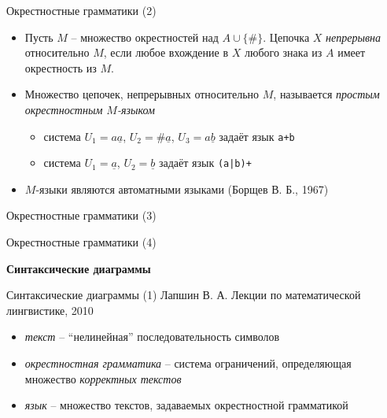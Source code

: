 \documentclass{beamer}
\begin{document}
\begin{frame}{Окрестностные грамматики (2)}
\begin{small}
\begin{itemize}
	\item Пусть $M$ -- множество окрестностей над $A \cup \{ \# \}$. Цепочка $X$ \textit{непрерывна} относительно $M$, если любое вхождение в $X$ любого знака из $A$ имеет окрестность из $M$.
	\item Множество цепочек, непрерывных относительно $M$, называется \textit{простым окрестностным $M$-языком}
		\begin{itemize}
			\item система $U_1 = a\underline{a}$, $U_2 = \#\underline{a}$, $U_3 = a\underline{b}$ задаёт язык \texttt{a+b}
			\item система $U_1 = \underline{a}$, $U_2 = \underline{b}$ задаёт язык \texttt{(a|b)+}
		\end{itemize}
	\item $M$-языки являются автоматными языками (Борщев В. Б., 1967)
\end{itemize}
\end{small}
\end{frame}

\begin{frame}{Окрестностные грамматики (3)}
\end{frame}

\begin{frame}{Окрестностные грамматики (4)}
\end{frame}



\begin{frame}{}
\begin{center}
	\textbf{Синтаксические диаграммы}
\end{center}
\end{frame}

\begin{frame}{Синтаксические диаграммы (1)}
Лапшин В. А. Лекции по математической лингвистике, 2010\\
\medskip
\begin{small}
\begin{itemize}
	\item \textit{текст} -- ``нелинейная'' последовательность символов
	\item \textit{окрестностная грамматика} -- система ограничений, определяющая множество \textit{корректных текстов}
	\item \textit{язык} -- множество текстов, задаваемых окрестностной грамматикой
\end{itemize}
\end{small}
\end{frame}
\end{document}
